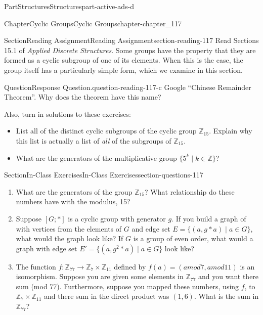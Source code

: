 \documentclass[oneside,10pt,]{book}
\numberwithin{equation}{section}
\begin{document}
\begin{partptx}{Part}{Structures}{}{Structures}{}{}{part-active-ads-d}
\begin{chapterptx}{Chapter}{Cyclic Groups}{}{Cyclic Groups}{}{}{chapter-chapter_117}
%
%
\typeout{************************************************}
\typeout{************************************************}
%
\begin{sectionptx}{Section}{Reading Assignment}{}{Reading Assignment}{}{}{section-reading-117}
Read Sections 15.1 of \emph{Applied Discrete Structures}. Some groups have the property that they are formed as a cyclic subgroup of one of its elements.  When this is the case, the group itself has a particularly simple form, which we examine in this section.%
\begin{question}{Question}{Response Question.}{question-reading-117-c}%
Google ``Chinese Remainder Theorem''. Why does the theorem have this name?%
\end{question}
Also, turn in solutions to these exercises:%
\begin{itemize}[label=\textbullet]
\item{}List all of the distinct cyclic subgroups of the cyclic group \(\mathbb{Z}_{15}\).  Explain why this list is actually a list of \emph{all} of the subgroups of \(\mathbb{Z}_{15}\).%
\item{}What are the generators of the multiplicative group \(\{5^k \mid k\in \mathbb{Z}\}\)?%
\end{itemize}
%
\end{sectionptx}
%
%
\typeout{************************************************}
\typeout{************************************************}
%
\begin{sectionptx}{Section}{In-Class Exercises}{}{In-Class Exercises}{}{}{section-questions-117}
%
\begin{enumerate}[label=\arabic*.]
\item{}What are the generators of the group \(\mathbb{Z}_{15}\)?  What relationship do these numbers have with the modulus, 15?%
\item{}Suppose \([G;*]\) is a cyclic group with generator \(g\). If you build a graph of with vertices from the elements of \(G\) and edge set \(E= \{(a, g*a) \mid a\in G\}\), what would the graph look like?  If \(G\) is a group of even order, what would a graph with edge set \(E'= \{(a, g^2*a) \mid a\in G\}\) look like?%
\item{}The function \(f: \mathbb{Z}_{77} \rightarrow \mathbb{Z}_7\times \mathbb{Z}_{11}\) defined by \(f(a)= (a mod 7, a mod 11)\) is an isomorphism.  Suppose you are given some elements in \(\mathbb{Z}_{77}\) and you want there sum (mod 77).  Furthermore, suppose you mapped these numbers, using \(f\), to \(\mathbb{Z}_7\times \mathbb{Z}_{11}\) and there sum in the direct product was \((1,6)\).  What is the sum in \(\mathbb{Z}_{77}\)?%

\end{enumerate}
\end{sectionptx}
\end{chapterptx}
\end{partptx}
\end{document}
